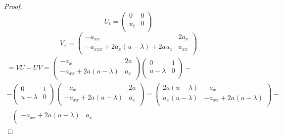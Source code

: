 \documentclass[12pt]{article}
\theoremstyle{definition}
\begin{document}
\begin{itemize}
\begin{proof}
    \begin{equation}
        U_t=\left(
            \begin{array}{cc}
             0 & 0\\
             u_t & 0\\
        \end{array}
        \right)
    \end{equation}
    \begin{equation}
        V_x=\left(
            \begin{array}{cc}
             -a_{xx} & 2a_x\\
             -a_{xxx}+2a_x(u-\lambda)+2au_x & a_{xx}\\
        \end{array}
        \right)
    \end{equation}
    \begin{multline}
        [V,U]=VU-UV=\left(
            \begin{array}{cc}
             -a_x & 2a\\
             -a_{xx}+2a(u-\lambda) & a_x\\
        \end{array}
        \right)\left(
            \begin{array}{cc}
             0 & 1\\
             u-\lambda & 0\\
        \end{array}
        \right)-\\-\left(
            \begin{array}{cc}
             0 & 1\\
             u-\lambda & 0\\
        \end{array}
        \right)\left(
            \begin{array}{cc}
             -a_x & 2a\\
             -a_{xx}+2a(u-\lambda) & a_x\\
        \end{array}
        \right)=\left(
            \begin{array}{cc}
             2a(u-\lambda) & -a_x\\
             a_x(u-\lambda) & -a_{xx}+2a(u-\lambda)\\
        \end{array}
        \right)-\\-\left(
            \begin{array}{cc}
             -a_{xx}+2a(u-\lambda) & a_x\\

\end{array}
\end{multline}
\end{proof}
\end{itemize}
\end{document}
